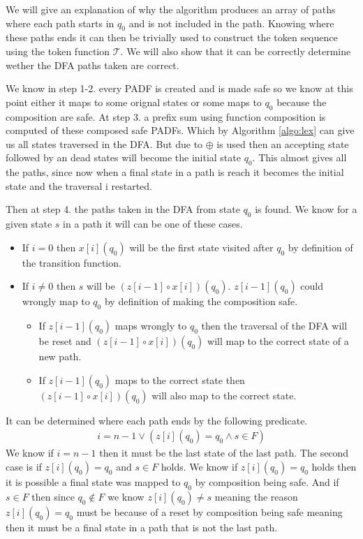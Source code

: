 \documentclass[a4paper,12pt]{article}
\theoremstyle{definition}
\begin{document}
\noindent We will give an explanation of why the algorithm produces an array of paths where each path starts in $q_0$ and is not included in the path. Knowing where these paths ends it can then be trivially used to construct the token sequence using the token function $\mathcal{T}$. We will also show that it can be correctly determine wether the DFA paths taken are correct.

We know in step 1-2. every PADF is created and is made safe so we know at this point either it maps to some orignal states or some maps to $q_0$ because the composition are safe. At step 3. a prefix sum using function composition is computed of these composed safe PADFs. Which by Algorithm \ref{algo:lex} can give us all states traversed in the DFA. But due to $\oplus$ is used then an accepting state followed by an dead states will become the initial state $q_0$. This almost gives all the paths, since now when a final state in a path is reach it becomes the initial state and the traversal i restarted.

Then at step 4. the paths taken in the DFA from state $q_0$ is found. We know for a given state $s$ in a path it will can be one of these cases.
\begin{itemize}
  \item If $i = 0$ then $x[i](q_0)$ will be the first state visited after $q_0$ by definition of the transition function.
  \item If $i \neq 0$ then $s$ will be $(z[i - 1] \circ x[i])(q_0)$. $z[i - 1](q_0)$ could wrongly map to $q_0$ by definition of making the composition safe.
  \begin{itemize}
    \item If $z[i - 1](q_0)$ maps wrongly to $q_0$ then the traversal of the DFA will be reset and $(z[i - 1] \circ x[i])(q_0)$ will map to the correct state of a new path.
    \item If $z[i - 1](q_0)$ maps to the correct state then $(z[i - 1] \circ x[i])(q_0)$ will also map to the correct state.
  \end{itemize}
\end{itemize}
It can be determined where each path ends by the following predicate.
\begin{align*}
  i = n - 1 \lor (z[i](q_0) = q_0 \land s \in F)
\end{align*}
We know if $i = n - 1$ then it must be the last state of the last path. The second case is if $z[i](q_0) = q_0$ and $s \in F$ holds. We know if $z[i](q_0) = q_0$ holds then it is possible a final state was mapped to $q_0$ by composition being safe. And if $s \in F$ then since $q_0 \notin F$ we know $z[i](q_0) \neq s$ meaning the reason $z[i](q_0) = q_0$ must be because of a reset by composition being safe meaning then it must be a final state in a path that is not the last path.
\end{document}
